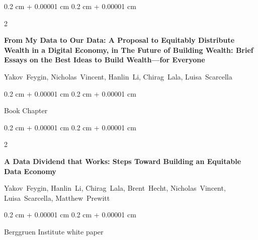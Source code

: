 \documentclass[10pt, letterpaper]{article}
\newenvironment{onecolentry}{
    \begin{adjustwidth}{
        0.2 cm + 0.00001 cm
    }{
        0.2 cm + 0.00001 cm
    }
}{
    \end{adjustwidth}
} %
\newenvironment{twocolentry}[2][]{
    \onecolentry
    \def\secondColumn{#2}
    \setcolumnwidth{\fill, 4.1 cm}
    \begin{paracol}{2}
}{
    \switchcolumn \raggedleft \secondColumn
    \end{paracol}
    \endonecolentry
} %
\begin{document}
        \vspace{0.2 cm}

        \begin{samepage}
            \begin{twocolentry}{
                2021
            }
                \textbf{From My Data to Our Data: A Proposal to Equitably Distribute Wealth in a Digital Economy, in The Future of Building Wealth: Brief Essays on the Best Ideas to Build Wealth—for Everyone}

                \vspace{0.10 cm}

                \mbox{Yakov Feygin}, \mbox{Nicholas Vincent}, \mbox{Hanlin Li}, \mbox{Chirag Lala}, \mbox{Luisa Scarcella}
            \end{twocolentry}


            \vspace{0.10 cm}

            \begin{onecolentry}
        Book Chapter    \end{onecolentry}
        \end{samepage}

        \vspace{0.2 cm}

        \begin{samepage}
            \begin{twocolentry}{
                2021
            }
                \textbf{A Data Dividend that Works: Steps Toward Building an Equitable Data Economy}

                \vspace{0.10 cm}

                \mbox{Yakov Feygin}, \mbox{Hanlin Li}, \mbox{Chirag Lala}, \mbox{Brent Hecht}, \mbox{Nicholas Vincent}, \mbox{Luisa Scarcella}, \mbox{Matthew Prewitt}
            \end{twocolentry}


            \vspace{0.10 cm}

            \begin{onecolentry}
        Berggruen Institute white paper    \end{onecolentry}
        \end{samepage}

        \vspace{0.2 cm}
\end{document}

